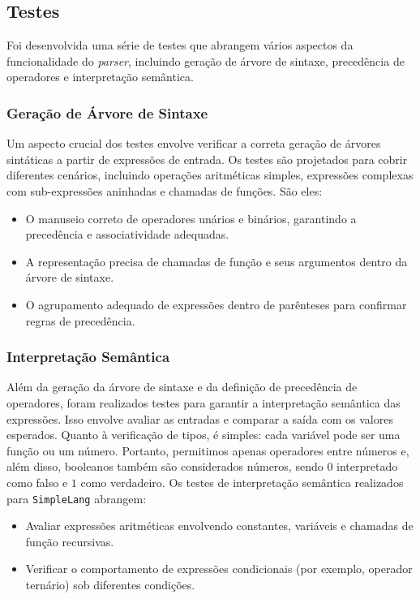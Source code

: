 \documentclass[english, 
               brazil, 
               bsc] %
               {dcomp-abntex2}
\begin{document}
\subsection{Testes}


Foi desenvolvida uma série de testes que  abrangem vários aspectos da funcionalidade do \textit{parser}, incluindo geração de árvore de sintaxe, precedência de operadores e interpretação semântica.


\subsubsection{Geração de Árvore de Sintaxe}


Um aspecto crucial dos testes envolve verificar a correta geração de árvores sintáticas a partir de expressões de entrada. Os testes são projetados para cobrir diferentes cenários, incluindo operações aritméticas simples, expressões complexas com sub-expressões aninhadas e chamadas de funções. São eles:


\begin{itemize}
    \item O manuseio correto de operadores unários e binários, garantindo a precedência e associatividade adequadas.
    \item A representação precisa de chamadas de função e seus argumentos dentro da árvore de sintaxe.
    \item O agrupamento adequado de expressões dentro de parênteses para confirmar regras de precedência.
\end{itemize}

\subsubsection{Interpretação Semântica}

Além da geração da árvore de sintaxe e da definição de precedência de operadores, foram realizados testes para garantir a interpretação semântica das expressões. Isso envolve avaliar as entradas e comparar a saída com os valores esperados. Quanto à verificação de tipos, é simples: cada variável pode ser uma função ou um número. Portanto, permitimos apenas operadores entre números e, além disso, booleanos também são considerados números, sendo $0$ interpretado como falso e $1$ como verdadeiro. Os testes de interpretação semântica realizados para \texttt{SimpleLang} abrangem:


\begin{itemize}
    \item Avaliar expressões aritméticas envolvendo constantes, variáveis e chamadas de função recursivas.
    \item Verificar o comportamento de expressões condicionais (por exemplo, operador ternário) sob diferentes condições.
\end{itemize}
\end{document}

